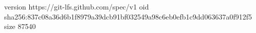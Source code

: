 version https://git-lfs.github.com/spec/v1
oid sha256:837c08a36d6b1f8979a39dcb91bf032549a98c6eb0efb1c9dd063637a0f912f5
size 87540
